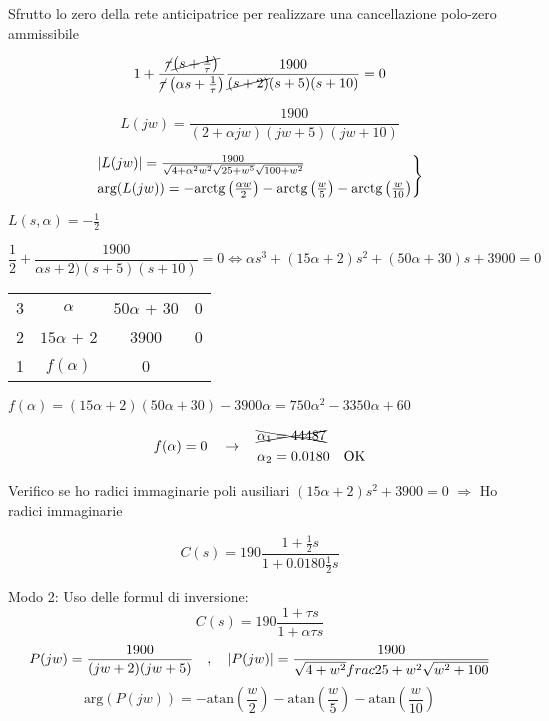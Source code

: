 \documentclass{article}
\begin{document}
Sfrutto lo zero della rete anticipatrice per realizzare una cancellazione polo-zero ammissibile

\[ 1+ \frac{\cancel{\tau}\cancel{\left( s + \frac{1}{\tau}\right)}}{\cancel{\tau} \left( \alpha s + \frac{1}{\tau}\right)}\frac{1900}{\cancel{(s+2)}(s+5)(s+10)} = 0 \]

\[ L(jw) = \frac{1900}{(2 + \alpha jw) (jw + 5)(jw + 10)} \]

\[
    \begin{rcases}
     |L(jw)| = \frac{1900}{\sqrt{4 + \alpha^2 w^2} \sqrt{25 + w^5} \sqrt{100 + w^2}}\\
     \text{arg}(L(jw)) = -\text{arctg}\left(\frac{\alpha w}{2}\right) - \text{arctg}\left( \frac{w}{5} \right) - \text{arctg}\left(\frac{w}{10}\right)
    \end{rcases}
\]

$L(s, \alpha) = -\frac{1}{2}$ 

\[ \frac{1}{2} + \frac{1900}{\alpha s + 2)(s + 5) (s+10)} = 0 \Leftrightarrow \alpha s^3 + (15 \alpha + 2)s^2 + (50 \alpha + 30) s + 3900 = 0 \]

\begin{minipage}{0.30\textwidth}
\begin{tabular}{c| c c c}
    3 & $\alpha$ & $50\alpha$ + 30 & 0\\
    2 & $15\alpha$ + 2 & 3900 & 0\\
    1 & $f(\alpha)$ & 0
\end{tabular}
\end{minipage}
\begin{minipage}{0.65\textwidth}
    $ f(\alpha) = (15 \alpha + 2) ( 50 \alpha + 30) - 3900\alpha = 750\alpha^2 - 3350\alpha + 60 $
\end{minipage}

\[
    f(\alpha) = 0
    \quad\rightarrow\quad
    \begin{aligned}
        &\xcancel{\alpha_1 = 44487}\\
        &\alpha_2 = 0.0180 \quad \text{OK}
    \end{aligned}
\]

Verifico se ho radici immaginarie poli ausiliari $(15 \alpha + 2) s^2 + 3900 = 0$ $\Rightarrow$ Ho radici immaginarie

\[C(s) = 190 \frac{1 + \frac{1}{2}s}{1 + 0.0180 \frac{1}{2} s}\]

Modo 2: Uso delle formul di inversione:
\[ C(s) = 190 \frac{1 + \tau s}{1 + \alpha \tau s}\]
\[ P(jw) = \frac{1900}{(jw + 2)(jw+5) } \quad , \quad |P(jw)| = \frac{1900}{\sqrt{4 + w^2}\\frac{25 + w^2}\sqrt{w^2 + 100}} \]
\[ \text{arg}(P(jw)) = - \text{atan}\left(\frac{w}{2}\right) - \text{atan}\left(\frac{w}{5}\right) -\text{atan}\left(\frac{w}{10}\right)\]
\end{document}
